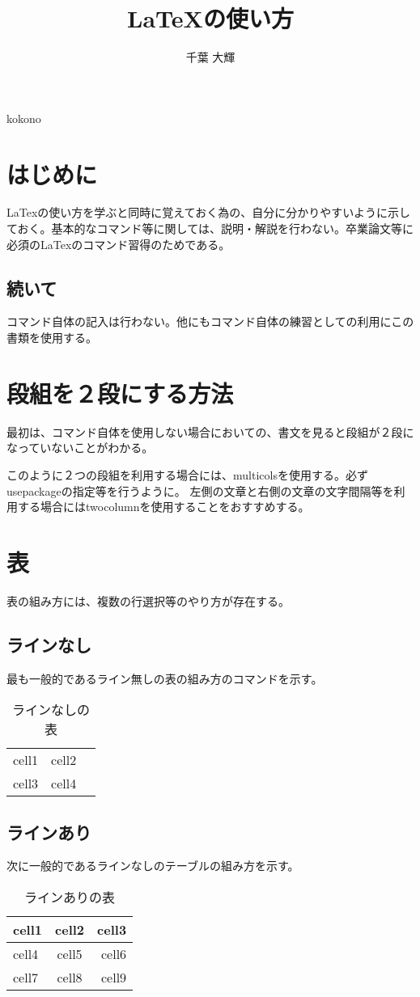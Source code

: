 \documentclass[11pt, oneside]{article}   	%
\title{LaTeXの使い方}
\author{千葉 大輝}
\begin{document}
\maketitle
kokono
\newpage
\section{はじめに}
LaTexの使い方を学ぶと同時に覚えておく為の、自分に分かりやすいように示しておく。基本的なコマンド等に関しては、説明・解説を行わない。卒業論文等に必須のLaTexのコマンド習得のためである。
\subsection{続いて}
コマンド自体の記入は行わない。他にもコマンド自体の練習としての利用にこの書類を使用する。
\section{段組を２段にする方法}
最初は、コマンド自体を使用しない場合においての、書文を見ると段組が２段になっていないことがわかる。
\begin{multicols}{2}
このように２つの段組を利用する場合には、multicolsを使用する。必ずusepackageの指定等を行うように。
左側の文章と右側の文章の文字間隔等を利用する場合にはtwocolumnを使用することをおすすめする。
\end{multicols}

\section{表}
表の組み方には、複数の行選択等のやり方が存在する。
\subsection{ラインなし}
最も一般的であるライン無しの表の組み方のコマンドを示す。
\begin{table}[h]
\begin{center}
\begin{tabular}{lcr}
cell1&cell2\\
cell3&cell4\\
\end{tabular}
\caption{ラインなしの表}
\end{center}
\end{table}

\subsection{ラインあり}
次に一般的であるラインなしのテーブルの組み方を示す。
\begin{table}[h]
\begin{center}
\begin{tabular}{|l|c|r|}
\hline
cell1 & cell2 & cell3 \\ \hline\hline
cell4 & cell5 & cell6 \\ \hline
cell7 & cell8 & cell9 \\ 
\hline
\end{tabular}
\caption{ラインありの表}
\end{center}
\end{table}
\end{document}
